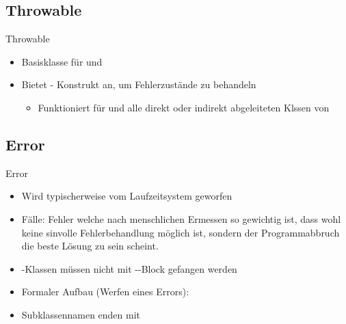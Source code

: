 \documentclass{../tuda-beamer}
\begin{document}
    \subsection{Throwable}
    \label{subsec:throwable}
    \begin{frame}{Throwable}
        \begin{itemize}
            \item Basisklasse für  und 
            \item Bietet - Konstrukt an, um Fehlerzustände
            zu behandeln
            \begin{itemize}
                \item Funktioniert für  und alle direkt oder indirekt
                abgeleiteten Klssen von 
            \end{itemize}
        \end{itemize}

        
    \end{frame}

    \subsection{Error}
    \label{subsec:error}
    \begin{frame}[c]{Error}
        \begin{itemize}
            \item Wird typischerweise vom Laufzeitsystem geworfen
            \item Fälle: Fehler welche nach menschlichen Ermessen so gewichtig ist, dass wohl keine
            sinvolle Fehlerbehandlung möglich ist, sondern der Programmabbruch die beste Lösung
            zu sein scheint.
            \item {}-Klassen müssen nicht mit
            --Block gefangen werden
            \item Formaler Aufbau (Werfen eines Errors):

            \begin{center}
            \end{center}
            \item Subklassennamen enden mit 
        \end{itemize}
    \end{frame}
\end{document}
